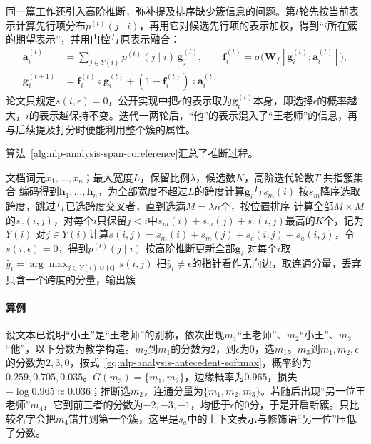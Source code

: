 同一篇工作还引入高阶推断，弥补提及排序缺少簇信息的问题。第$t$轮先按当前表示计算先行项分布$p^{(t)}(j\mid i)$，再用它对候选先行项的表示加权，得到“$i$所在簇的期望表示”，并用门控与原表示融合：
\[
  \begin{aligned}
    \bm a_i^{(t)}&=\sum_{j\in Y(i)}p^{(t)}(j\mid i)\,\bm g_j^{(t)},\qquad
    \bm f_i^{(t)}=\sigma\bigl(\bm W_f[\bm g_i^{(t)};\bm a_i^{(t)}]\bigr),\\
    \bm g_i^{(t+1)}&=\bm f_i^{(t)}\circ\bm g_i^{(t)}+(1-\bm f_i^{(t)})\circ\bm a_i^{(t)},
  \end{aligned}
\]
论文只规定$s(i,\epsilon)=0$，公开实现中把$\epsilon$的表示取为$\bm g_i^{(t)}$本身，即选择$\epsilon$的概率越大，$i$的表示越保持不变。迭代一两轮后，“他”的表示混入了“王老师”的信息，再与后续提及打分时便能利用整个簇的属性。

算法~\ref{alg:nlp-analysis-span-coreference}汇总了推断过程。

\begin{algorithm}[粗到细的端到端跨度共指推断]
  \label{alg:nlp-analysis-span-coreference}
  \begin{algorithmic}[1]
    \Require 文档词元$x_1,\ldots,x_n$；最大宽度$L$，保留比例$\lambda$，候选数$K$，高阶迭代轮数$T$
    \Ensure 共指簇集合
    \State 编码得到$\bm h_1,\ldots,\bm h_n$，为全部宽度不超过$L$的跨度计算$\bm g_i$与$s_m(i)$
    \State 按$s_m$降序选取跨度，跳过与已选跨度交叉者，直到选满$M=\lambda n$个，按位置排序
    \State 计算全部$M\times M$的$s_c(i,j)$，对每个$i$只保留$j<i$中$s_m(i)+s_m(j)+s_c(i,j)$最高的$K$个，记为$Y(i)$
      \State 对$j\in Y(i)$计算$s(i,j)=s_m(i)+s_m(j)+s_c(i,j)+s_a(i,j)$，令$s(i,\epsilon)=0$，得到$p^{(t)}(j\mid i)$
      \State 按高阶推断更新全部$\bm g_i$
    \EndFor
    \State 对每个$i$取$\hat y_i=\arg\max_{j\in Y(i)\cup\{\epsilon\}}s(i,j)$
    \State 把$\hat y_i\neq\epsilon$的指针看作无向边，取连通分量，丢弃只含一个跨度的分量，输出簇
  \end{algorithmic}
\end{algorithm}

\paragraph{算例}
设文本已说明“小王”是“王老师”的别称，依次出现$m_1$“王老师”、$m_2$“小王”、$m_3$“他”，以下分数为教学构造。$m_2$到$m_1$的分数为2，到$\epsilon$为0，选$m_1$。$m_3$到$m_1,m_2,\epsilon$的分数为$2,3,0$，按式~\eqref{eq:nlp-analysis-antecedent-softmax}，概率约为$0.259,0.705,0.035$。$G(m_3)=\{m_1,m_2\}$，边缘概率为$0.965$，损失$-\log0.965\approx0.036$；推断选$m_2$，连通分量为$\{m_1,m_2,m_3\}$。若随后出现“另一位王老师”$m_4$，它到前三者的分数为$-2,-3,-1$，均低于$\epsilon$的0分，于是开启新簇。只比较名字会把$m_4$错并到第一个簇，这里是$s_a$中的上下文表示与修饰语“另一位”压低了分数。

